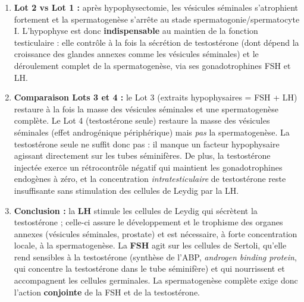 \documentclass[11pt]{article}
\begin{document}
\begin{corrige}
\begin{enumerate}
    \item \textbf{Lot 2 vs Lot 1 :} après hypophysectomie, les vésicules séminales s'atrophient fortement et la spermatogenèse s'arrête au stade spermatogonie/spermatocyte I. L'hypophyse est donc \textbf{indispensable} au maintien de la fonction testiculaire : elle contrôle à la fois la sécrétion de testostérone (dont dépend la croissance des glandes annexes comme les vésicules séminales) et le déroulement complet de la spermatogenèse, via ses gonadotrophines FSH et LH.
    \item \textbf{Comparaison Lots 3 et 4 :} le Lot 3 (extraits hypophysaires = FSH + LH) restaure à la fois la masse des vésicules séminales et une spermatogenèse complète. Le Lot 4 (testostérone seule) restaure la masse des vésicules séminales (effet androgénique périphérique) mais \emph{pas} la spermatogenèse. La testostérone seule ne suffit donc pas : il manque un facteur hypophysaire agissant directement sur les tubes séminifères. De plus, la testostérone injectée exerce un rétrocontrôle négatif qui maintient les gonadotrophines endogènes à zéro, et la concentration \emph{intratesticulaire} de testostérone reste insuffisante sans stimulation des cellules de Leydig par la LH.
    \item \textbf{Conclusion :} la \textbf{LH} stimule les cellules de Leydig qui sécrètent la testostérone ; celle-ci assure le développement et le trophisme des organes annexes (vésicules séminales, prostate) et est nécessaire, à forte concentration locale, à la spermatogenèse. La \textbf{FSH} agit sur les cellules de Sertoli, qu'elle rend sensibles à la testostérone (synthèse de l'ABP, \emph{androgen binding protein}, qui concentre la testostérone dans le tube séminifère) et qui nourrissent et accompagnent les cellules germinales. La spermatogenèse complète exige donc l'action \textbf{conjointe} de la FSH et de la testostérone.
\end{enumerate}
\end{corrige}
\end{document}
